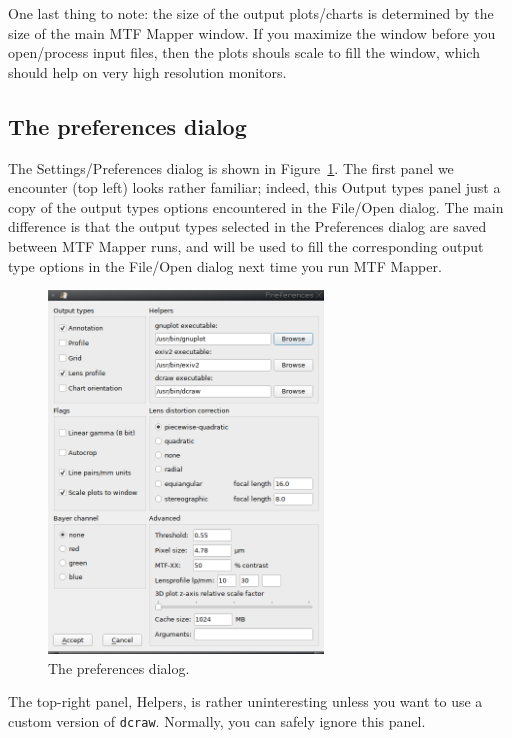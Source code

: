 \documentclass[a4paper]{article}
\begin{document}
One last thing to note: the size of the output plots/charts is determined by
the size of the main MTF Mapper window. If you maximize the window before
you open/process input files, then the plots shouls scale to fill the
window, which should help on very high resolution monitors.

\subsection{The preferences dialog}
\label{sec:settings}
The \textsf{Settings/Preferences} dialog is shown in
Figure~\ref{fig:settings}. The first panel we encounter (top left) looks
rather familiar; indeed, this \textsf{Output types} panel just a copy of the output
types options encountered in the \textsf{File/Open} dialog. The main
difference is that the output types selected in the \textsf{Preferences}
dialog are saved between MTF Mapper runs, and will be used to fill the corresponding
output type options in the \textsf{File/Open} dialog next time you run MTF
Mapper.

\begin{figure}[ht!]
\centering
\includegraphics[width=0.65\textwidth]{figures/settings}
\caption{The preferences dialog.}
\label{fig:settings}
\end{figure}

The top-right panel, \textsf{Helpers}, is rather uninteresting unless you
want to use a custom version of \texttt{dcraw}. Normally, you can safely
ignore this panel.
\end{document}

